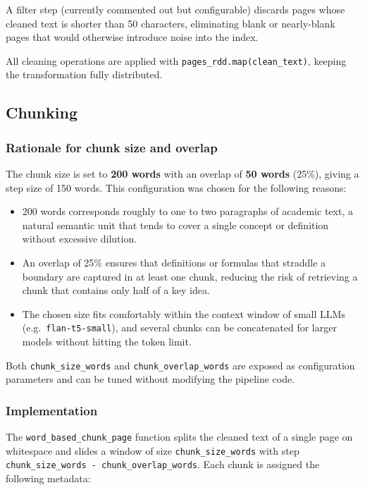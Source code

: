 \documentclass[a4paper,11pt]{article}
\begin{document}
A filter step (currently commented out but configurable) discards pages whose
cleaned text is shorter than 50 characters, eliminating blank or
nearly-blank pages that would otherwise introduce noise into the index.

All cleaning operations are applied with \texttt{pages\_rdd.map(clean\_text)},
keeping the transformation fully distributed.

\subsection{Chunking}

\subsubsection{Rationale for chunk size and overlap}

The chunk size is set to \textbf{200 words} with an overlap of \textbf{50 words}
(25\%), giving a step size of 150 words. This configuration was chosen for
the following reasons:

\begin{itemize}[noitemsep]
  \item 200 words corresponds roughly to one to two paragraphs of academic
        text, a natural semantic unit that tends to cover a single concept or
        definition without excessive dilution.
  \item An overlap of 25\% ensures that definitions or formulas that straddle
        a boundary are captured in at least one chunk, reducing the risk of
        retrieving a chunk that contains only half of a key idea.
  \item The chosen size fits comfortably within the context window of small
        LLMs (e.g.\ \texttt{flan-t5-small}), and several chunks can be
        concatenated for larger models without hitting the token limit.
\end{itemize}

Both \texttt{chunk\_size\_words} and \texttt{chunk\_overlap\_words} are
exposed as configuration parameters and can be tuned without modifying the
pipeline code.

\subsubsection{Implementation}

The \texttt{word\_based\_chunk\_page} function splits the cleaned text of a
single page on whitespace and slides a window of size
\texttt{chunk\_size\_words} with step \texttt{chunk\_size\_words - chunk\_overlap\_words}.
Each chunk is assigned the following metadata:
\end{document}
